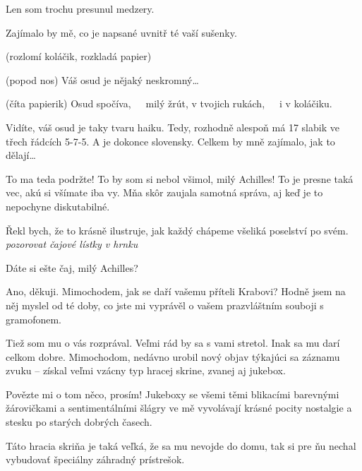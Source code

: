 \documentclass[12pt]{article}
\begin{document}
\begin{description}[itemsep=0pt]
\item[Ž:] Len som trochu presunul medzery.

\item[A:] Zajímalo by mě, co je napsané uvnitř té vaší sušenky.

\item[Ž:] (rozlomí koláčik, rozkladá papier)

\item[A:] (popod nos) Váš osud je nějaký neskromný\dots

\item[Ž:] (číta papierik) Osud spočíva,\ \ \ milý žrút, v tvojich rukách,\ \ \ i v koláčiku.

\item[A:] Vidíte, váš osud je taky tvaru haiku. Tedy, rozhodně alespoň má
    17 slabik ve třech řádcích 5-7-5. A je dokonce slovensky. Celkem by mně zajímalo, jak to dělají\dots

\item[Ž:] To ma teda podržte! To by som si nebol všimol, milý Achilles! To je presne 
    taká vec, akú si všímate iba vy. Mňa skôr zaujala samotná správa, aj keď je 
    to nepochyne diskutabilné.

\item[A:] Řekl bych, že to krásně ilustruje, jak každý chápeme všeliká poselství
    po svém. \textit{pozorovat čajové lístky v hrnku}

\item[Ž:] Dáte si ešte čaj, milý Achilles?

\item[A:] Ano, děkuji. Mimochodem, jak se daří vašemu příteli Krabovi? Hodně jsem na něj
    myslel od té doby, co jste mi vyprávěl o vašem prazvláštním souboji s gramofonem.

\item[Ž:] Tiež som mu o vás rozprával. Veľmi rád by sa s vami stretol. Inak sa mu darí 
    celkom dobre. Mimochodom, nedávno urobil nový objav týkajúci sa záznamu zvuku -- získal 
    veľmi vzácny typ hracej skrine, zvanej aj jukebox.

\item[A:] Povězte mi o tom něco, prosím! Jukeboxy se všemi těmi blikacími barevnými
    žárovičkami a sentimentálními šlágry ve mě vyvolávají krásné pocity nostalgie
    a stesku po starých dobrých časech.

\item[Ž:] Táto hracia skriňa je taká veľká, že sa mu nevojde do domu, tak si pre ňu 
    nechal vybudovať špeciálny záhradný prístrešok. 


\end{description}
\end{document}
